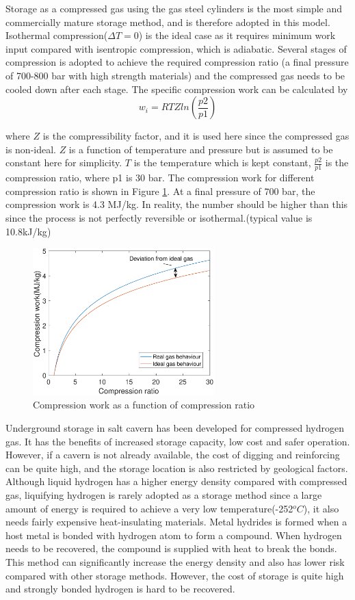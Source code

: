 \documentclass[11pt, a4paper]{article}
\begin{document}
Storage as a compressed gas using the gas steel cylinders is the most simple and commercially mature storage method, and is therefore adopted in this model. Isothermal compression($\Delta T = 0$) is the ideal case as it requires minimum work input compared with isentropic compression, which is adiabatic. Several stages of compression is adopted to achieve the required compression ratio (a final pressure of 700-800 bar with high strength materials) and the compressed gas needs to be cooled down after each stage.  The specific compression work can be calculated by \cite{gas}
\begin{equation}
w_i = RTZln(\frac{p2}{p1})
\end{equation}

where $Z$ is the compressibility factor, and it is used here since the compressed gas is non-ideal. $Z$  is a function of temperature and pressure but is assumed to be constant here for simplicity. $T$ is the temperature which is kept constant, $\frac{p2}{p1}$ is the compression ratio, where p1 is 30 bar. The compression work for different compression ratio is shown in Figure \ref{fig:compression}. At a final pressure of 700 bar, the compression work is 4.3 MJ/kg. In reality, the number should be higher than this since the process is not perfectly reversible or isothermal.(typical value is 10.8kJ/kg\cite{storage})

\begin{figure}[H]
\centering
\includegraphics[width=7cm]{compression.eps}
\caption{Compression work as a function of compression ratio}
\label{fig:compression}
\end{figure}

Underground storage in salt cavern has been developed for compressed hydrogen gas. It has the benefits of increased storage capacity, low cost and safer operation. However, if a cavern is not already available, the cost of digging and reinforcing can be quite high, and the storage location is also restricted by geological factors.\cite{cons} Although liquid hydrogen has a higher energy density compared with compressed gas, liquifying hydrogen is rarely adopted as a storage method since a large amount of energy is required to achieve a very low temperature(-252$^oC$), it also needs fairly expensive heat-insulating materials. Metal hydrides is formed when a host metal is bonded with hydrogen atom to form a compound. When hydrogen needs to be recovered, the compound is supplied with heat to break the bonds. This method can significantly increase the energy density and also has lower risk compared with other storage methods. However, the cost of storage is quite high and strongly bonded hydrogen is hard to be recovered.\cite{storage3}
\end{document}
